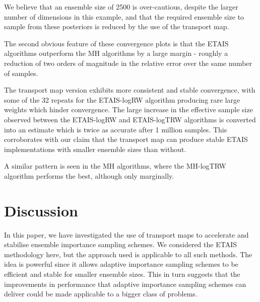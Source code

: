 \documentclass[final]{siamltex}
\newcommand{\edit}[1]{{\color{red} #1}}
\begin{document}
We believe that an ensemble size of 2500
is over-cautious, despite the larger number of dimensions in this
example, and that the required ensemble size to sample
from these posteriors is reduced by the use of the transport map.

The second obvious feature of these convergence plots is that the ETAIS
algorithms outperform the MH algorithms by a large margin - roughly a
reduction of two orders of magnitude in the relative error over the
same number of samples.


\edit{The transport map version exhibits more
consistent and stable convergence, with some of the 32 repeats for the
ETAIS-logRW algorithm producing rare large weights which hinder convergence.}
The large increase in the effective sample size
observed between the ETAIS-logRW and ETAIS-logTRW algorithms is
converted into an estimate which is twice as accurate after 1 million
samples. This corroborates with our claim that the transport map can
produce stable ETAIS implementations with smaller ensemble sizes than without.

\edit{A similar pattern is seen in the MH algorithms, where the MH-logTRW algorithm performs the best,
although only marginally. }

\section{Discussion}\label{sec:conc}
In this paper, we have investigated the use of transport maps to
accelerate and stabilise ensemble importance sampling schemes. We
considered the ETAIS methodology here, but the approach used is
applicable to all such methods. The idea is powerful since it allows
adaptive importance sampling schemes to be efficient and stable for
smaller ensemble sizes. This in turn suggests that the improvements in
performance that adaptive importance sampling schemes can deliver
could be made applicable to a bigger class of problems.
\end{document}
